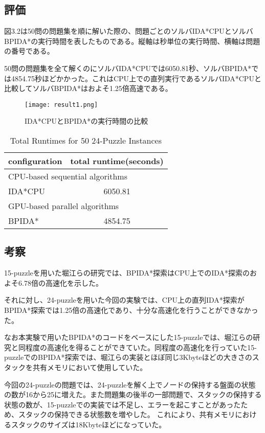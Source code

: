 \documentclass[a4paper,11pt,oneside,openany]{jsbook}
\begin{document}
\subsection{評価}
図3.2は50問の問題集を順に解いた際の、問題ごとのソルバIDA*CPUとソルバBPIDA*の実行時間を表したものである。縦軸は秒単位の実行時間、横軸は問題の番号である。

50問の問題集を全て解くのにソルバIDA*CPUでは6050.81秒、ソルバBPIDA*では4854.75秒ほどかかった。これはCPU上での直列実行であるソルバIDA*CPUと比較してソルバBPIDA*はおよそ1.25倍高速である。


\begin{figure}[H]
\begin{center}
\texttt{[image: result1.png]}
\caption{IDA*CPUとBPIDA*の実行時間の比較}
\end{center}
\end{figure}

\begin{table}[H]
\centering
\caption{Total Runtimes for 50 24-Puzzle Instances}
\label{my-label}
\begin{tabular}{|l|c|}
\hline
configuration & \multicolumn{1}{l|}{total runtime(seconds)} \\ \hline
\multicolumn{2}{|l|}{CPU-based sequential algorithms} \\ \hline
IDA*CPU & 6050.81 \\ \hline
\multicolumn{2}{|l|}{GPU-based parallel algorithms} \\ \hline
BPIDA* & 4854.75 \\ \hline
\end{tabular}
\end{table}


\subsection{考察}
15-puzzleを用いた堀江らの研究\cite{HA17}では、BPIDA*探索はCPU上でのIDA*探索のおよそ6.78倍の高速化を示した。

それに対し、24-puzzleを用いた今回の実験では、CPU上の直列IDA*探索がBPIDA*探索では1.25倍の高速化であり、十分な高速化を行うことができなかった。

なお本実験で用いたBPIDA*のコードをベースにした15-puzzleでは、堀江らの研究と同程度の高速化を得ることができていた。同程度の高速化を行っていた15-puzzleでのBPIDA*探索では、堀江らの実装とほぼ同じ3Kbyteほどの大きさのスタックを共有メモリにおいて使用していた。

今回の24-puzzleの問題では、24-puzzleを解く上でノードの保持する盤面の状態の数が16から25に増えた。また問題集の後半の一部問題で、スタックの保持する状態の数が、15-puzzleでの実装では不足し、エラーを起こすことがあったため、スタックの保持できる状態数を増やした。
これにより、共有メモリにおけるスタックのサイズは18Kbyteほどになっていた。
\end{document}
